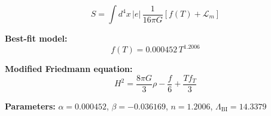 
\begin{equation}
  S = \int d^4x \, |e| \, \frac{1}{16\pi G} \left[ f(T) + \mathcal{L}_m \right]
\end{equation}

\textbf{Best-fit model:}
\begin{equation}
  f(T) = 0.000452 \, T^{1.2006}
\end{equation}

\textbf{Modified Friedmann equation:}
\begin{equation}
  H^2 = \frac{8\pi G}{3} \rho - \frac{f}{6} + \frac{T f_T}{3}
\end{equation}

\textbf{Parameters:}
$\alpha = 0.000452$, \quad
$\beta = -0.036169$, \quad
$n = 1.2006$, \quad
$\Lambda_{\text{BI}} = 14.3379$
